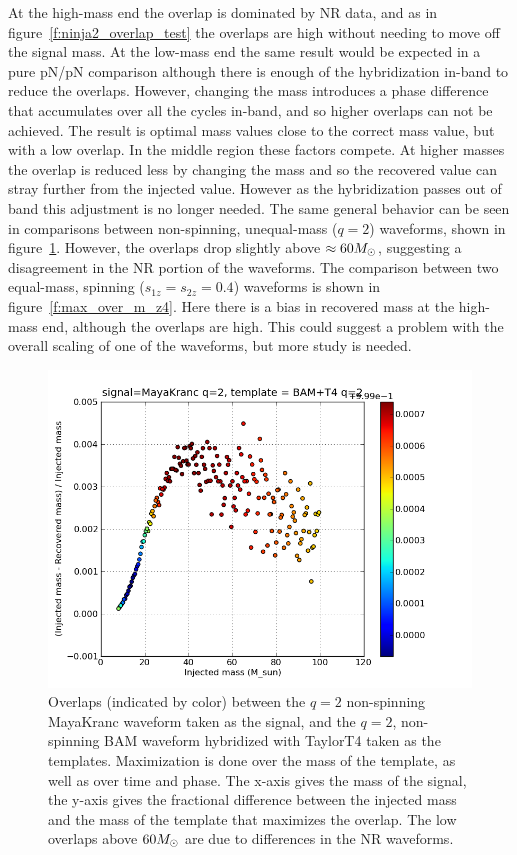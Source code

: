 At the high-mass end the overlap is dominated by NR data, and as in
figure~\ref{f:ninja2_overlap_test} the overlaps are high without
needing to move off the signal mass.  At the low-mass end the same
result would be expected in a pure pN/pN comparison although there is
enough of the hybridization in-band to reduce the overlaps.  However,
changing the mass introduces a phase difference that accumulates over
all the cycles in-band, and so higher overlaps can not be achieved.
The result is optimal mass values close to the correct mass value, but
with a low overlap.  In the middle region these factors compete.  At
higher masses the overlap is reduced less by changing the mass and so
the recovered value can stray further from the injected value.
However as the hybridization passes out of band this adjustment is no
longer needed.  The same general behavior can be seen in comparisons
between non-spinning, unequal-mass ($q=2$) waveforms, shown in
figure~\ref{f:max_over_m_q2}.  However, the overlaps drop slightly
above $\approx 60 M_\odot$, suggesting a disagreement in the NR portion
of the waveforms.  The comparison between two equal-mass, spinning
($s_{1z} = s_{2z} = 0.4$) waveforms is shown in
figure~\ref{f:max_over_m_z4}.  Here there is a bias in recovered mass
at the high-mass end, although the overlaps are high.  This could
suggest a problem with the overall scaling of one of the waveforms,
but more study is needed.


\begin{figure}
  \includegraphics[width=\linewidth]{figures/ninja2/maya_bam_q2_max_over_m} 
  \caption[Overlaps between unequal-mass submissions maximized over mass]{
  \label{f:max_over_m_q2}
Overlaps (indicated by color) between the $q=2$ non-spinning MayaKranc
waveform taken as the signal, and the $q=2$, non-spinning BAM waveform
hybridized with TaylorT4 taken as the templates.  Maximization is done
over the mass of the template, as well as over time and phase.  The
x-axis gives the mass of the signal, the y-axis gives the fractional
difference between the injected mass and the mass of the template that
maximizes the overlap.  The low overlaps above $60 M_\odot$ are due
to differences in the NR waveforms.}
\end{figure}%


